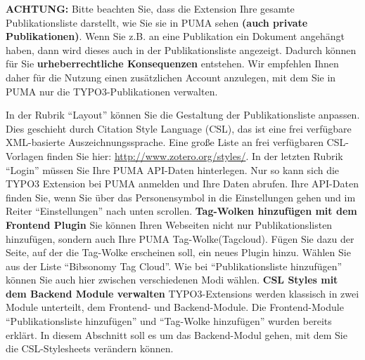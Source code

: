 \documentclass[b5paper,11pt,twoside]{scrbook} %
\begin{document}
\begin{shaded} \centering
\textbf{ACHTUNG:} Bitte beachten Sie, dass die Extension Ihre gesamte Publikationsliste darstellt, wie Sie sie in PUMA sehen \textbf{(auch private Publikationen)}. Wenn Sie z.B. an eine Publikation ein Dokument angehängt haben, dann wird dieses auch in der Publikationsliste angezeigt. Dadurch können für Sie \textbf{urheberrechtliche Konsequenzen} entstehen. Wir empfehlen Ihnen daher für die Nutzung einen zusätzlichen Account anzulegen, mit dem Sie in PUMA nur die TYPO3-Publikationen verwalten.
\end{shaded} \newline
In der Rubrik \enquote{Layout} können Sie die Gestaltung der Publikationsliste anpassen. Dies geschieht durch Citation Style Language (CSL), das ist eine frei verfügbare XML-basierte Auszeichnungssprache. Eine große Liste an frei verfügbaren CSL-Vorlagen finden Sie hier: \url{http://www.zotero.org/styles/}.%
\newline
\newline
In der letzten Rubrik \enquote{Login} müssen Sie Ihre PUMA API-Daten hinterlegen. Nur so kann sich die TYPO3 Extension bei PUMA anmelden und Ihre Daten abrufen. Ihre API-Daten finden Sie, wenn Sie über das Personensymbol in die Einstellungen gehen und im Reiter \enquote{Einstellungen} nach unten scrollen. \newline
\newline
\textbf{Tag-Wolken hinzufügen mit dem Frontend Plugin}\newline\newline
Sie können Ihren Webseiten nicht nur Publikationslisten hinzufügen, sondern auch Ihre PUMA  Tag-Wolke(Tagcloud). Fügen Sie dazu der Seite, auf der die Tag-Wolke erscheinen soll, ein neues Plugin hinzu. Wählen Sie aus der Liste \enquote{Bibsonomy Tag Cloud}.\newline \newline %
Wie bei \enquote{Publikationsliste hinzufügen} können Sie auch hier zwischen verschiedenen Modi wählen.\newline \newline %
\textbf{CSL Styles mit dem Backend Module verwalten}\newline
\newline
TYPO3-Extensions werden klassisch in zwei Module unterteilt, dem Frontend- und Backend-Module. Die Frontend-Module \enquote{Publikationsliste hinzufügen} und \enquote{Tag-Wolke hinzufügen} wurden bereits erklärt. In diesem Abschnitt soll es um das Backend-Modul gehen, mit dem Sie die CSL-Stylesheets verändern können.\newline \newline
\end{document}
